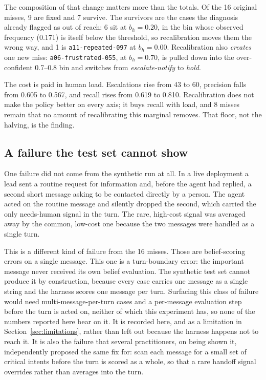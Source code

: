 \documentclass{article}
\begin{document}
The composition of that change matters more than the totals. Of the 16 original
misses, 9 are fixed and 7 survive. The survivors are the cases the diagnosis
already flagged as out of reach: 6 sit at $b_h = 0.20$, in the bin whose observed
frequency (0.171) is itself below the threshold, so recalibration moves them the
wrong way, and 1 is \texttt{a11-repeated-097} at $b_h = 0.00$. Recalibration also
\emph{creates} one new miss: \texttt{a06-frustrated-055}, at $b_h = 0.70$, is pulled
down into the over-confident 0.7--0.8 bin and switches from
\emph{escalate-notify} to \emph{hold}.

The cost is paid in human load. Escalations rise from 43 to 60, precision falls from
0.605 to 0.567, and recall rises from 0.619 to 0.810. Recalibration does not make
the policy better on every axis; it buys recall with load, and 8 misses remain that
no amount of recalibrating this marginal removes. That floor, not the halving, is
the finding.


\subsection{A failure the test set cannot show}
One failure did not come from the synthetic run at all. In a live deployment a
lead sent a routine request for information and, before the agent had replied, a
second short message asking to be contacted directly by a person. The agent acted
on the routine message and silently dropped the second, which carried the only
needs-human signal in the turn. The rare, high-cost signal was averaged away by
the common, low-cost one because the two messages were handled as a single turn.

This is a different kind of failure from the 16 misses. Those are belief-scoring
errors on a single message. This one is a turn-boundary error: the important
message never received its own belief evaluation. The synthetic test set cannot
produce it by construction, because every case carries one message as a single
string and the harness scores one message per turn. Surfacing this class of
failure would need multi-message-per-turn cases and a per-message evaluation step
before the turn is acted on, neither of which this experiment has, so none of the
numbers reported here bear on it. It is recorded here, and as a limitation in
Section~\ref{sec:limitations}, rather than left out because the harness happens
not to reach it. It is also the failure that several practitioners, on being shown
it, independently proposed the same fix for: scan each message for a small set of
critical intents before the turn is scored as a whole, so that a rare handoff
signal overrides rather than averages into the turn.
\end{document}

